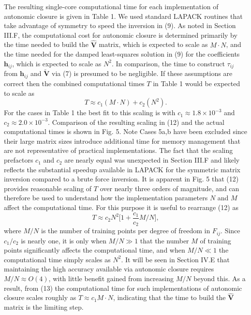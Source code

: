 The resulting single-core computational time for each implementation of autonomic closure is given in Table 1. We used standard LAPACK routines that take advantage of symmetry to speed the inversion in (9). As noted in Section III.F, the computational cost for autonomic closure is determined primarily by the time needed to build the $\widehat{\mathbf{V}}$  matrix, which is expected to scale as $M \cdot N$, and the time needed for the damped least-squares solution in (9) for the coefficients $\mathbf{h}_{ij}$, which is expected to scale as $N^2$. In comparison, the time to construct  $\tau_{ij}$ from  $\mathbf{h}_{ij}$  and  $\widetilde{\mathbf{V}}$  via (7) is presumed to be negligible. If these assumptions are correct then the combined computational times $T$ in Table 1 would be expected to scale as
%
\begin{equation}
	\label{E:12}
	T \approx c_1 (M \cdot N) + c_2 (N^2).
\end{equation}
%
%         
For the cases in Table 1 the best fit to this scaling is with $c_1 \approx 1.8 \times 10^{-3}$  and  $c_2 \approx 2.0 \times 10^{-3}$. Comparison of the resulting scaling in (12) and the actual computational times is shown in Fig. 5. Note Cases 5a,b have been excluded since their large matrix sizes introduce additional time for memory management that are not representative of practical implementations. The fact that the scaling prefactors $c_1$  and  $c_2$ are nearly equal was unexpected in Section III.F and likely reflects the substantial speedup available in LAPACK for the symmetric matrix inversion compared to a brute force inversion.
It is apparent in Fig. 5 that (12) provides reasonable scaling of $T$ over nearly three orders of magnitude, and can therefore be used to understand how the implementation parameters $N$ and $M$ affect the computational time. For this purpose it is useful to rearrange (12) as
%
\begin{equation}
	\label{E:13}
	T \approx c_2 N^2 \bigg[ 1 + \frac{c_1}{c_2} M/N \bigg] ,
\end{equation}
%
%         
where  $M/N$ is the number of training points per degree of freedom in $F_{ij}$. Since $c_1/c_2$  is nearly one, it is only when $M/N \gg 1$  that the number $M$ of training points significantly affects the computational time, and when  $M/N \ll 1$ the computational time simply scales as $N^2$. It will be seen in Section IV.E that maintaining the high accuracy available via autonomic closure requires $M/N \approx O(4)$, with little benefit gained from increasing $M/N$  beyond this. As a result, from (13) the computational time for such implementations of autonomic closure scales roughly as $T \approx c_1 M \cdot N$, indicating that the time to build the $\widehat{\mathbf{V}}$ matrix is the limiting step.  

